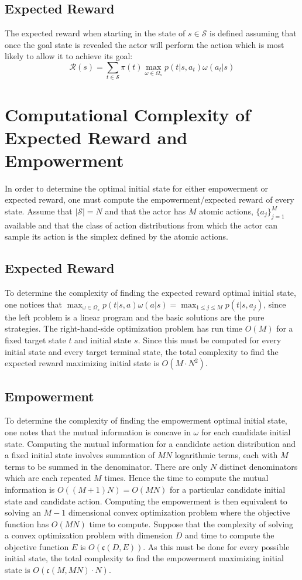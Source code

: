 \documentclass{article}
\newcommand{\Ss}{\mathcal{S}}
\newcommand{\Rr}{\mathcal{R}}
\begin{document}
\subsection{Expected Reward}
The expected reward when starting in the state of $s\in\mathcal{S}$ is defined assuming that once the goal state is revealed the actor will perform the action which is most likely to allow it to achieve its goal:
\[\Rr(s) = \sum_{t\in\Ss} \pi(t) \max_{\omega\in\Omega_s} p(t|s,a_t)\omega(a_t|s)\]


\section{Computational Complexity of Expected Reward and Empowerment}
In order to determine the optimal initial state for either empowerment or expected reward, one must compute the empowerment/expected reward of every state. Assume that $|\Ss|=N$ and that the actor has $M$ atomic actions, $\{a_j\}_{j=1}^M$ available and that the class of action distributions from which the actor can sample its action is the simplex defined by the atomic actions. 

\subsection{Expected Reward}
To determine the complexity of finding the expected reward optimal initial state, one notices that $\max_{\omega\in\Omega_s} p(t|s,a)\omega(a|s) = \max_{1\leq j \leq M} p(t|s,a_j)$, since the left problem is a linear program and the basic solutions are the pure strategies.
The right-hand-side optimization problem has run time $O(M)$ for a fixed target state $t$ and initial state $s$. Since this must be computed for every initial state and every target terminal state, the total complexity to find the expected reward maximizing initial state is $O(M\cdot N^2)$. 

\subsection{Empowerment}
To determine the complexity of finding the empowerment optimal initial state, one notes that the mutual information is concave \cite{braverman2011information} in $\omega$ for each candidate initial state. Computing the mutual information for a candidate action distribution and a fixed initial state involves summation of $MN$ logarithmic terms, each with $M$ terms to be summed in the denominator. There are only $N$ distinct denominators which are each repeated $M$ times. Hence the time to compute the mutual information is $O((M+1)N)=O(MN)$ for a particular candidate initial state and candidate action. Computing the empowerment is then equivalent to solving an $M-1$ dimensional convex optimization problem where the objective function has $O(MN)$ time to compute.  Suppose that the complexity of solving a convex optimization problem with dimension $D$ and time to compute the objective function $E$ is $O(\mathfrak{c}(D,E))$. As this must be done for every possible initial state, the total complexity to find the empowerment maximizing initial state is $O(\mathfrak{c}(M,MN)\cdot N)$. 
\end{document}
